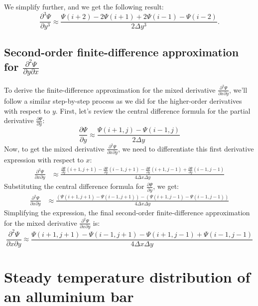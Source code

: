\documentclass{article}
\begin{document}
We simplify further, and we get the following result:
\begin{equation}
\frac{\partial^3 \Psi}{\partial y^3} \approx \frac{\Psi(i+2) - 2\Psi(i+1) + 2\Psi(i-1) - \Psi(i-2)}{2\Delta y^3}.
\end{equation}


\subsection{Second-order finite-difference approximation for \texorpdfstring{$\frac{\partial^2 \Psi}{\partial y \partial x}$}{d2Psi/dy dx}}
To derive the finite-difference approximation for the mixed derivative $\frac{\partial^2\Psi}{\partial x\partial y}$, we'll follow a similar step-by-step process as we did for the higher-order derivatives with respect to $y$.
First, let's review the central difference formula for the partial derivative $\frac{\partial\Psi}{\partial y}$:
\begin{equation}
\frac{\partial\Psi}{\partial y} \approx \frac{\Psi(i+1,j) - \Psi(i-1,j)}{2\Delta y}
\end{equation}
Now, to get the mixed derivative $\frac{\partial^2\Psi}{\partial x\partial y}$, we need to differentiate this first derivative expression with respect to $x$:
\begin{align}
\frac{\partial^2\Psi}{\partial x\partial y} &\approx \frac{\frac{\partial\Psi}{\partial y}(i+1,j+1) - \frac{\partial\Psi}{\partial y}(i-1,j+1) - \frac{\partial\Psi}{\partial y}(i+1,j-1) + \frac{\partial\Psi}{\partial y}(i-1,j-1)}{4\Delta x\Delta y}
\end{align}
Substituting the central difference formula for $\frac{\partial\Psi}{\partial y}$, we get:
\begin{align}
\frac{\partial^2\Psi}{\partial x\partial y} &\approx \frac{(\Psi(i+1,j+1) - \Psi(i-1,j+1)) - (\Psi(i+1,j-1) - \Psi(i-1,j-1))}{4\Delta x\Delta y}
\end{align}
Simplifying the expression, the final second-order finite-difference approximation for the mixed derivative $\frac{\partial^2\Psi}{\partial x\partial y}$ is:
\begin{equation}
\frac{\partial^2\Psi}{\partial x\partial y} \approx \frac{\Psi(i+1,j+1) - \Psi(i-1,j+1) - \Psi(i+1,j-1) + \Psi(i-1,j-1)}{4\Delta x\Delta y}
\end{equation}




\section{Steady temperature distribution of an alluminium bar}
\end{document}
